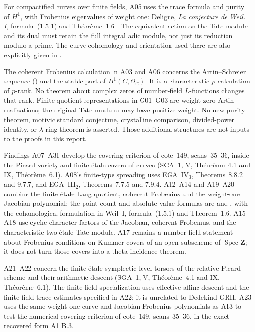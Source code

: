\documentclass[11pt,a4paper]{article}
\begin{document}
For compactified curves over finite fields, A05 uses the trace
formula and purity of $H^1$, with Frobenius eigenvalues of weight one:
Deligne, \emph{La conjecture de Weil. I}, formula~(1.5.1) and
Th\'eor\`eme~1.6 \cite{WeilI}. The equivalent action on the
Tate module and its dual must retain the full integral adic module,
not just its reduction modulo a prime. The curve cohomology and
orientation used there are also explicitly given in
\cite[Proposition~14.2 and Remark~14.10]{MilneLEC}.

The coherent Frobenius calculation in A03 and A06 concerns the
Artin--Schreier sequence (\cite[Example~7.9(b)]{MilneLEC}) and the stable part of $H^1(C,\mathcal O_C)$.
It is a characteristic-$p$ calculation of $p$-rank. No theorem about
complex zeros of number-field $L$-functions changes that rank.
Finite quotient representations in G01--G03 are weight-zero Artin
realizations; the original Tate modules may have positive weight.
No new purity theorem, motivic standard conjecture, crystalline
comparison, divided-power identity, or $\lambda$-ring theorem is
asserted. Those additional structures are not inputs to the proofs
in this report.


Findings A07--A31 develop the covering criterion of cote~149,
scans~35--36, inside the Picard variety and finite \'etale covers of
curves (SGA~1, V, Th\'eor\`eme~4.1 and IX, Th\'eor\`eme~6.1).
A08's finite-type spreading uses EGA~IV$_3$, Theorems~8.8.2 and
9.7.7, and EGA~III$_2$, Theorems~7.7.5 and 7.9.4.
A12--A14 and A19--A20 combine the finite \'etale Lang quotient,
coherent Frobenius and the weight-one Jacobian polynomial; the
point-count and absolute-value formulas are
\cite[Theorem~19.1(a)--(c)]{MilneAV} and
\cite[Theorem~11.1]{MilneJV}, with the cohomological formulation
in Weil~I, formula~(1.5.1) and Theorem~1.6.
A15--A18 use cyclic character factors of the Jacobian, coherent
Frobenius, and the characteristic-two \'etale Tate module.
A17 remains a number-field statement about Frobenius conditions
on Kummer covers of an open subscheme of $\operatorname{Spec}\mathbf Z$;
it does not turn those covers into a theta-incidence theorem.

A21--A22 concern the finite \'etale symplectic level torsors of the
relative Picard scheme and their arithmetic descent (SGA~1, V,
Th\'eor\`eme~4.1 and IX, Th\'eor\`eme~6.1). The finite-field
specialization uses effective affine descent and the finite-field
trace estimates specified in A22; it is unrelated to Dedekind GRH.
A23 uses the same weight-one curve and Jacobian Frobenius polynomials
as A13 to test the numerical covering criterion of cote~149,
scans~35--36, in the exact recovered form A1 B.3.
\end{document}
